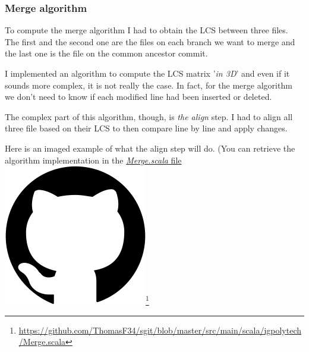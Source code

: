 \documentclass[11pt]{article}
\begin{document}
\subsubsection{Merge algorithm}
To compute the merge algorithm I had to obtain the LCS between three files. The first and the second one are the files on each branch we want to merge and the last one is the file on the common ancestor commit.

I implemented an algorithm to compute the LCS matrix '\textit{in 3D}' and even if it sounds more complex, it is not really the case. In fact, for the merge algorithm we don't need to know if each modified line had been inserted or deleted.

The complex part of this algorithm, though, is \textit{the align} step. I had to align all three file based on their LCS to then compare line by line and apply changes.

Here is an imaged example of what the align step will do. (You can retrieve the algorithm implementation in the \href{https://github.com/ThomasF34/sgit/blob/master/src/main/scala/igpolytech/Merge.scala}{\textit{Merge.scala} file \includegraphics[height=\fontcharht\font`\l]{img/github.png}}\footnote{\href{https://github.com/ThomasF34/sgit/blob/master/src/main/scala/igpolytech/Merge.scala}{\ul{https://github.com/ThomasF34/sgit/blob/master/src/main/scala/igpolytech/Merge.scala}}}
\end{document}
